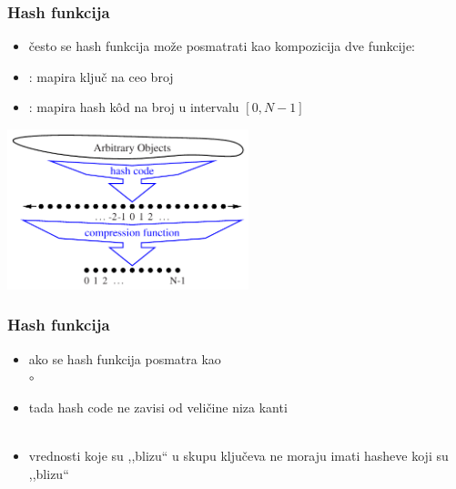 \documentclass[compress]{beamer}
\begin{document}
\begin{frame}[fragile]
  \frametitle{Hash funkcija}
  \begin{itemize}
    \item često se hash funkcija može posmatrati kao kompozicija dve funkcije:
    \item {}: mapira ključ na ceo broj
    \item {}: mapira hash kôd na broj u intervalu $[0,N-1]$ 
  \end{itemize}
  \begin{center}
    \includegraphics[width=7cm]{asp-10-pic07.pdf}
  \end{center}
\end{frame}

\begin{frame}[fragile]
  \frametitle{Hash funkcija}
  \begin{itemize}
    \item ako se hash funkcija posmatra kao \\  $\circ$ 
    \item tada hash code ne zavisi od veličine niza kanti \\ \ \\
    \item vrednosti koje su ,,blizu`` u skupu ključeva ne moraju imati hasheve koji su ,,blizu`` 
  \end{itemize}
\end{frame}
\end{document}
